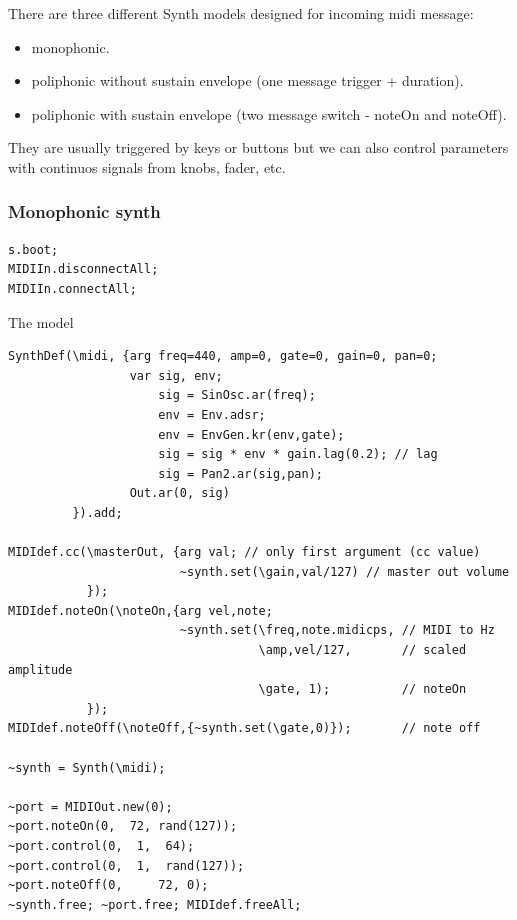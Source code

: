 There are three different Synth models designed for incoming midi message:

\begin{itemize}
\tightlist
\item monophonic.
\item poliphonic without sustain envelope (one message trigger + duration).
\item poliphonic with sustain envelope (two message switch - noteOn and noteOff).
\end{itemize}

They are usually triggered by keys or buttons but we can also control parameters with continuos signals from knobs, fader, etc.

\subsubsection{Monophonic synth}\label{monophonic-synth}

\begin{lstlisting}[frame=single] 
s.boot;
MIDIIn.disconnectAll;  
MIDIIn.connectAll;   
\end{lstlisting} 

The model

\begin{lstlisting}[frame=single, caption=MIDI monophonic instrument model] 
SynthDef(\midi, {arg freq=440, amp=0, gate=0, gain=0, pan=0; 
                 var sig, env;
                     sig = SinOsc.ar(freq);
                     env = Env.adsr;
                     env = EnvGen.kr(env,gate);
                     sig = sig * env * gain.lag(0.2); // lag 
                     sig = Pan2.ar(sig,pan);
                 Out.ar(0, sig)          
         }).add;

MIDIdef.cc(\masterOut, {arg val; // only first argument (cc value)
                        ~synth.set(\gain,val/127) // master out volume
           });
MIDIdef.noteOn(\noteOn,{arg vel,note;
                        ~synth.set(\freq,note.midicps, // MIDI to Hz
                                   \amp,vel/127,       // scaled amplitude
                                   \gate, 1);          // noteOn
           });
MIDIdef.noteOff(\noteOff,{~synth.set(\gate,0)});       // note off

~synth = Synth(\midi);

~port = MIDIOut.new(0);
~port.noteOn(0,  72, rand(127));
~port.control(0,  1,  64);
~port.control(0,  1,  rand(127));
~port.noteOff(0,     72, 0);
~synth.free; ~port.free; MIDIdef.freeAll;     
\end{lstlisting} 

